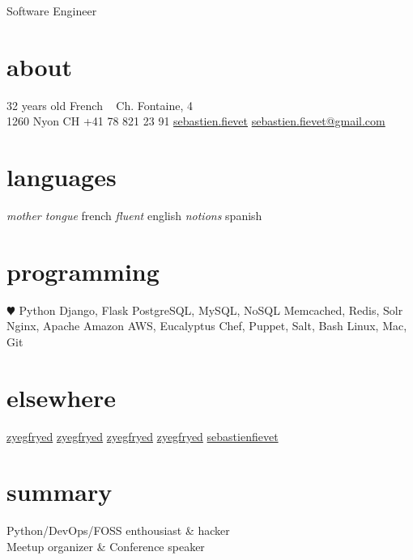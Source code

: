 \documentclass[]{friggeri}
\begin{document}
       {Software Engineer}

\begin{acronym}
\end{acronym}

\begin{aside}
  \section{about}
    32 years old
    French
    ~
    {\FA \faHome} Ch. Fontaine, 4\\1260 Nyon CH
    {\FA \faPhone} +41 78 821 23 91
    \href{skype:sebastienfievet?call}{{\FA \faSkype} sebastien.fievet}
    {\FA \faEnvelope} \href{mailto:sebastien.fievet@gmail.com}{sebastien.fievet@gmail.com}
  \section{languages}
    \emph{mother tongue} french
    \emph{fluent} english
    \emph{notions} spanish
  \section{programming}
    {\color{red} $\varheartsuit$} Python
    Django, Flask
    PostgreSQL, MySQL, NoSQL
    Memcached, Redis, Solr
    Nginx, Apache
    Amazon AWS, Eucalyptus
    Chef, Puppet, Salt, Bash
    Linux, Mac, Git
  \section{elsewhere}
    \href{https://twitter.com/zyegfryed}{{\FA \faTwitter} zyegfryed}
    \href{https://github.com/zyegfryed}{{\FA \faGithub} zyegfryed}
    \href{https://bitbucket.org/zyegfryed}{{\FA \faBitbucket} zyegfryed}
    \href{https://speakerdeck.com/zyegfryed}{{\FA \faBullhorn} zyegfryed}
    \href{http://www.linkedin.com/in/sebastienfievet}{{\FA \faLinkedin} sebastienfievet}
\end{aside}

\section{summary}

Python/DevOps/FOSS enthousiast \& hacker\\
Meetup organizer \& Conference speaker
\end{document}
